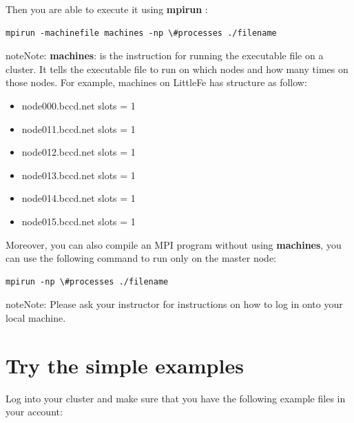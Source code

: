 \documentclass[letterpaper,10pt,openany,oneside]{sphinxmanual}
\begin{document}
Then you are able to execute it using \textbf{mpirun} :

\begin{Verbatim}[commandchars=\\\{\}]
mpirun -machinefile machines -np \#processes ./filename
\end{Verbatim}

\begin{notice}{note}{Note:}
\textbf{machines}: is the instruction for running the executable file on a cluster. It tells the executable file to run on which nodes and how many times on those nodes. For example, machines on LittleFe has structure as follow:
\begin{itemize}
\item {} 
node000.bccd.net    slots = 1

\item {} 
node011.bccd.net    slots = 1

\item {} 
node012.bccd.net    slots = 1

\item {} 
node013.bccd.net    slots = 1

\item {} 
node014.bccd.net    slots = 1

\item {} 
node015.bccd.net    slots = 1

\end{itemize}
\end{notice}

Moreover, you can also compile an MPI program without using \textbf{machines}, you can use the following command to run only on the master node:

\begin{Verbatim}[commandchars=\\\{\}]
mpirun -np \#processes ./filename
\end{Verbatim}

\begin{notice}{note}{Note:}
Please ask your instructor for instructions on how to log in onto your local machine.
\end{notice}


\section{Try the simple examples}
\label{CompileAndActivity/compileandactivity:try-the-simple-examples}
Log into your cluster and make sure that you have the following example files in your account:
\end{document}
